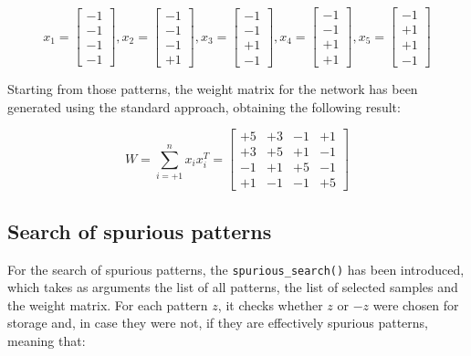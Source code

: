 \documentclass[letterpaper,headings=standardclasses]{scrartcl}
\begin{document}
$$ x_1 = \left[\begin{matrix} -1 \\ -1 \\ -1 \\ -1 \end{matrix}\right], x_2 = \left[\begin{matrix} -1 \\ -1 \\ -1 \\ +1 \end{matrix}\right], x_3 = \left[\begin{matrix} -1 \\ -1 \\ +1 \\ -1 \end{matrix}\right], x_4 = \left[\begin{matrix} -1 \\ -1 \\ +1 \\ +1 \end{matrix}\right], x_5 = \left[\begin{matrix} -1 \\ +1 \\ +1 \\ -1 \end{matrix}\right] $$

Starting from those patterns, the weight matrix for the network has been generated using the standard approach, obtaining the following result:

$$ W = \sum_{i =+1}^n x_i x_i^T = \left[ \begin{matrix}
    +5 & +3 & -1 & +1 \\
    +3 & +5 & +1 & -1 \\
    -1 & +1 & +5 & -1 \\
    +1 & -1 & -1 & +5
\end{matrix} \right] $$

\subsection{Search of spurious patterns}

For the search of spurious patterns, the \texttt{spurious\_search()} has been introduced, which takes as arguments the list of all patterns, the list of selected samples and the weight matrix. For each pattern $z$, it checks whether $z$ or $-z$ were chosen for storage and, in case they were not, if they are effectively spurious patterns, meaning that:
\end{document}
